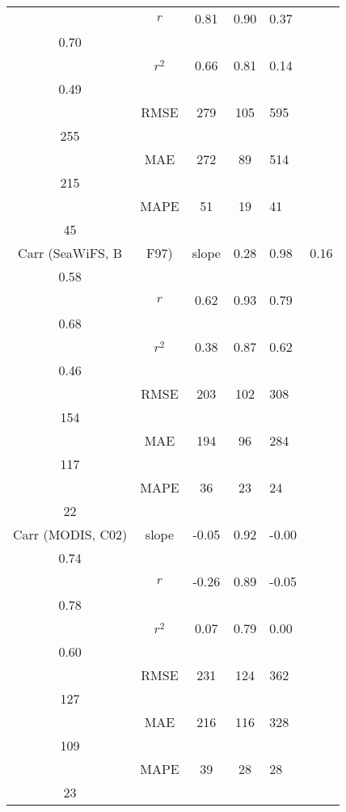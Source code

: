 \begin{table}[h]
\begin{tabular}{cccc}
& $r$ & 0.81 & 0.90 & 0.37 &  \\
0.70 \\
& $r^2$ & 0.66 & 0.81 & 0.14 &  \\
0.49 \\
& RMSE & 279 & 105 & 595 &  \\
255 \\
& MAE & 272 & 89 & 514 &  \\
215 \\
& MAPE & 51 & 19 & 41 &  \\
45 \\
\cmidrule(lr){1-6}
Carr (SeaWiFS, B&F97) & slope & 0.28 & 0.98 & 0.16 &  \\
0.58 \\
& $r$ & 0.62 & 0.93 & 0.79 &  \\
0.68 \\
& $r^2$ & 0.38 & 0.87 & 0.62 &  \\
0.46 \\
& RMSE & 203 & 102 & 308 &  \\
154 \\
& MAE & 194 & 96 & 284 &  \\
117 \\
& MAPE & 36 & 23 & 24 &  \\
22 \\
\cmidrule(lr){1-6}
Carr (MODIS, C02) & slope & -0.05 & 0.92 & -0.00 &  \\
0.74 \\
& $r$ & -0.26 & 0.89 & -0.05 &  \\
0.78 \\
& $r^2$ & 0.07 & 0.79 & 0.00 &  \\
0.60 \\
& RMSE & 231 & 124 & 362 &  \\
127 \\
& MAE & 216 & 116 & 328 &  \\
109 \\
& MAPE & 39 & 28 & 28 &  \\
23 \\
\bottomrule
\end{tabular}
\end{table}
